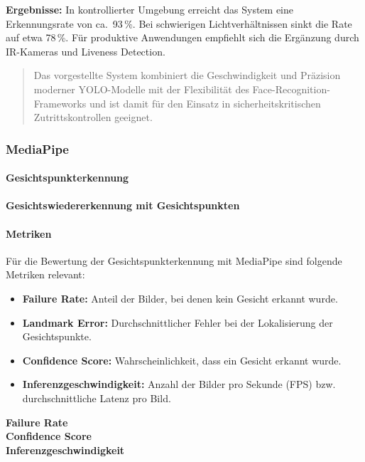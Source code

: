 \textbf{Ergebnisse:} In kontrollierter Umgebung erreicht das System eine Erkennungsrate von ca.~93\,\%. Bei schwierigen Lichtverhältnissen sinkt die Rate auf etwa 78\,\%. Für produktive Anwendungen empfiehlt sich die Ergänzung durch IR-Kameras und Liveness Detection.

\begin{quote}
Das vorgestellte System kombiniert die Geschwindigkeit und Präzision moderner YOLO-Modelle mit der Flexibilität des Face-Recognition-Frameworks und ist damit für den Einsatz in sicherheitskritischen Zutrittskontrollen geeignet.
\end{quote}

\subsubsection{MediaPipe}
\paragraph{Gesichtspunkterkennung}


\paragraph{Gesichtswiedererkennung mit Gesichtspunkten}

\paragraph{Metriken}
Für die Bewertung der Gesichtspunkterkennung mit MediaPipe sind folgende Metriken relevant:
\begin{itemize}
    \item \textbf{Failure Rate:} Anteil der Bilder, bei denen kein Gesicht erkannt wurde.
    \item \textbf{Landmark Error:} Durchschnittlicher Fehler bei der Lokalisierung der Gesichtspunkte.
    \item \textbf{Confidence Score:} Wahrscheinlichkeit, dass ein Gesicht erkannt wurde.
    \item \textbf{Inferenzgeschwindigkeit:} Anzahl der Bilder pro Sekunde (FPS) bzw. durchschnittliche Latenz pro Bild.
\end{itemize}


\textbf{Failure Rate} \\


\textbf{Confidence Score} \\


\textbf{Inferenzgeschwindigkeit} \\

